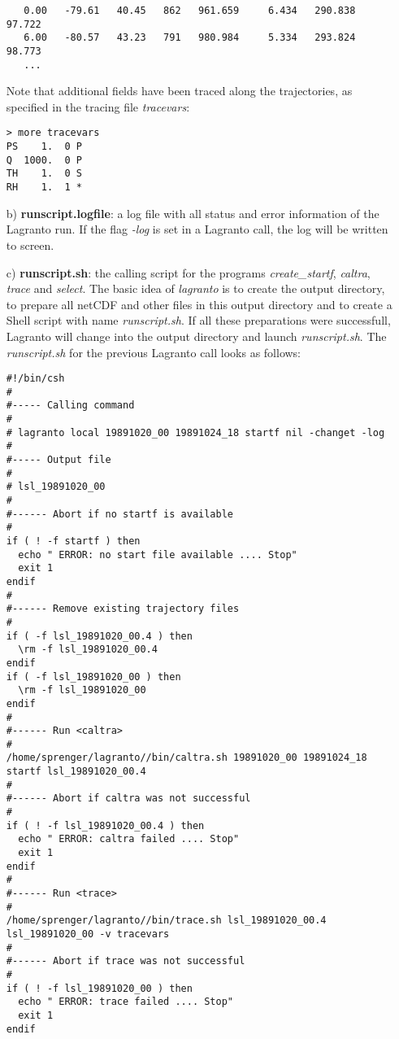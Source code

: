 \documentclass[a4paper,10pt]{article}
\begin{document}
\begin{itemize}
\begin{verbatim}
   0.00   -79.61   40.45   862   961.659     6.434   290.838    97.722
   6.00   -80.57   43.23   791   980.984     5.334   293.824    98.773
   ...
\end{verbatim}
Note that additional fields have been traced along the trajectories, as specified in the tracing file {\em tracevars}:
\begin{verbatim}
> more tracevars
PS    1.  0 P
Q  1000.  0 P
TH    1.  0 S
RH    1.  1 *
\end{verbatim}
\item[b)] {\bf runscript.logfile}: a log file with all status and error information of the Lagranto run. If the flag {\em -log} is set in a Lagranto call, the log will be written to screen.
\item[c)] {\bf runscript.sh}: the calling script for the programs {\em create\_startf}, {\em caltra}, {\em trace} and {\em select}. The basic idea of {\em lagranto} is to create the output directory, to prepare all netCDF and other files in this output directory and to create a Shell script with name {\em runscript.sh}. If all these preparations were successfull, Lagranto will change into the output directory and launch {\em runscript.sh}. The {\em runscript.sh} for the previous Lagranto call looks as follows:
\begin{small}
\begin{verbatim}
#!/bin/csh
#
#----- Calling command
#
# lagranto local 19891020_00 19891024_18 startf nil -changet -log 
#
#----- Output file    
#
# lsl_19891020_00                
#
#------ Abort if no startf is available
#
if ( ! -f startf ) then
  echo " ERROR: no start file available .... Stop"
  exit 1
endif
#
#------ Remove existing trajectory files
#
if ( -f lsl_19891020_00.4 ) then
  \rm -f lsl_19891020_00.4
endif
if ( -f lsl_19891020_00 ) then
  \rm -f lsl_19891020_00
endif
#
#------ Run <caltra>
#
/home/sprenger/lagranto//bin/caltra.sh 19891020_00 19891024_18 startf lsl_19891020_00.4
#
#------ Abort if caltra was not successful
#
if ( ! -f lsl_19891020_00.4 ) then
  echo " ERROR: caltra failed .... Stop"
  exit 1
endif
#
#------ Run <trace>
#
/home/sprenger/lagranto//bin/trace.sh lsl_19891020_00.4 lsl_19891020_00 -v tracevars
#
#------ Abort if trace was not successful
#
if ( ! -f lsl_19891020_00 ) then
  echo " ERROR: trace failed .... Stop"
  exit 1
endif
\end{verbatim}
\end{small}
\end{itemize}
\end{document}

